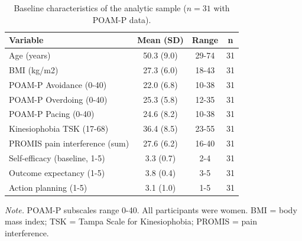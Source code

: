 \begin{table}[H]
\raggedright
\caption{Baseline characteristics of the analytic sample ($n=31$ with POAM-P data).}
\label{tab:sample}
\footnotesize
\begingroup
\setlength{\tabcolsep}{4pt}
\renewcommand{\arraystretch}{1.08}
\noindent
\begin{tabular*}{\textwidth}{@{\extracolsep{\fill}}lccc@{}}
\toprule
Variable & Mean (SD) & Range & n \\
\midrule
Age (years) & 50.3 (9.0) & 29-74 & 31 \\
BMI (kg/m2) & 27.3 (6.0) & 18-43 & 31 \\
POAM-P Avoidance (0-40) & 22.0 (6.8) & 10-38 & 31 \\
POAM-P Overdoing (0-40) & 25.3 (5.8) & 12-35 & 31 \\
POAM-P Pacing (0-40) & 24.6 (8.2) & 10-38 & 31 \\
Kinesiophobia TSK (17-68) & 36.4 (8.5) & 23-55 & 31 \\
PROMIS pain interference (sum) & 27.6 (6.2) & 16-40 & 31 \\
Self-efficacy (baseline, 1-5) & 3.3 (0.7) & 2-4 & 31 \\
Outcome expectancy (1-5) & 3.8 (0.4) & 3-5 & 31 \\
Action planning (1-5) & 3.1 (1.0) & 1-5 & 31 \\
\bottomrule
\end{tabular*}
\par\vspace{3pt}\noindent\parbox{\textwidth}{\footnotesize\textit{Note.} POAM-P subscales range 0-40. All participants were women. BMI = body mass index; TSK = Tampa Scale for Kinesiophobia; PROMIS = pain interference.}
\endgroup
\end{table}
